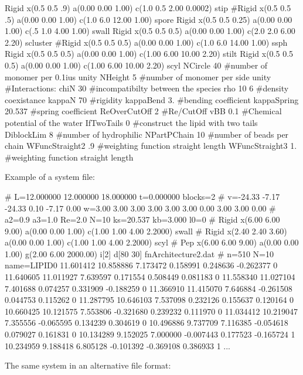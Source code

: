 \begin{DoxyCode}
Rigid x(0.5 0.5 .9) a(0.00 0.00 1.00) c(1.0 0.5 2.00 0.0002) s{tip}
#Rigid x(0.5 0.5 .5) a(0.00 0.00 1.00) c(1.0 6.0 12.00 1.00) s{pore}
Rigid x(0.5 0.5 0.25) a(0.00 0.00 1.00) c(.5 1.0 4.00 1.00) s{wall}
Rigid x(0.5 0.5 0.5) a(0.00 0.00 1.00) c(2.0 2.0 6.00 2.20) s{cluster}
#Rigid x(0.5 0.5 0.5) a(0.00 0.00 1.00) c(1.0 6.0 14.00 1.00) s{sph}
Rigid x(0.5 0.5 0.5) a(0.00 0.00 1.00) c(1.00 6.00 10.00 2.20) s{tilt}
Rigid x(0.5 0.5 0.5) a(0.00 0.00 1.00) c(1.00 6.00 10.00 2.20) s{cyl}
NCircle 40        #number of monomer per 0.1ius unity
NHeight 5       #number of monomer per side unity
#Interactions:
chiN 30             #incompatibilty between the species
rho 10 6               #density coexistance
kappaN 70           #rigidity
kappaBend    3.     #bending coefficient
kappaSpring 20.537  #spring coefficient
ReOverCutOff 2      #Re/CutOff
vBB 0.1            #Chemical potential of the water
IfTwoTails 0        #construct the lipid with two tails
DiblockLim   8     #number of hydrophilic
NPartPChain  10   #number of beads per chain
WFuncStraight2 .9   #weighting function straight length
WFuncStraight3 1.   #weighting function straight length
\end{DoxyCode}
 \-Example of a system file\-: 
\begin{DoxyCode}
# L=12.000000 12.000000 18.000000 t=0.000000 blocks=2
# v=-24.33 -7.17 -24.33 0.10 -7.17 0.00 w=3.00 3.00 3.00 3.00 3.00 3.00 0.00
       3.00 3.00 0.00
# a2=0.9 a3=1.0 Re=2.0 N=10 ks=20.537 kb=3.000 l0=0
# Rigid x(6.00 6.00 9.00) a(0.00 0.00 1.00) c(1.00 1.00 4.00 2.2000) s{wall}
# Rigid x(2.40 2.40 3.60) a(0.00 0.00 1.00) c(1.00 1.00 4.00 2.2000) s{cyl}
# Pep x(6.00 6.00 9.00) a(0.00 0.00 1.00) g(2.00 6.00 2000.00) i[2] d[80 30]
       fn{Architecture2.dat}
# n=510 N=10 name=LIPID0
11.601412 10.858886 7.173472 0.158991 0.248636 -0.262377  0 
11.640605 11.011927 7.639597 0.171554 0.508449 0.081183  0 
11.558340 11.027104 7.401688 0.074257 0.331909 -0.188259  0 
11.366910 11.415070 7.646884 -0.261508 0.044753 0.115262  0 
11.287795 10.646103 7.537098 0.232126 0.155637 0.120164  0 
10.660425 10.121575 7.553806 -0.321680 0.239232 0.111970  0 
11.034412 10.219047 7.355556 -0.065595 0.134239 0.304619  0 
10.496886 9.737709 7.116385 -0.054618 0.079027 0.161831  0 
10.134289 9.152025 7.000000 -0.007443 0.177523 -0.165724  1 
10.234959 9.188418 6.805128 -0.101392 -0.369108 0.386933  1 
...
\end{DoxyCode}
 \-The same system in an alternative file format\-: 
